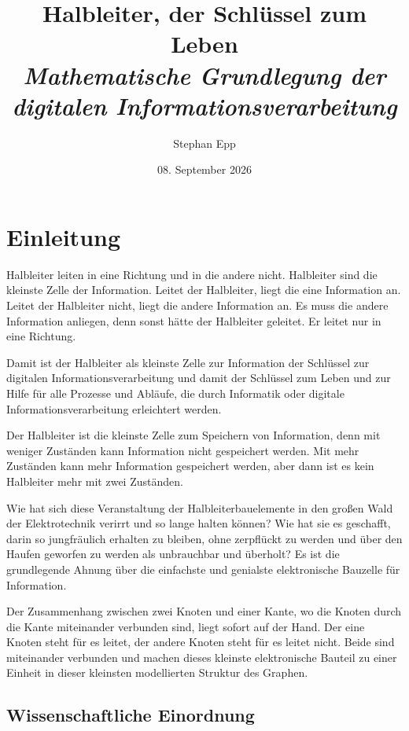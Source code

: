 \documentclass[12pt, a4paper]{article}
\title{\textbf{Halbleiter, der Schlüssel zum Leben}\\[0.5em]
  {\Large\itshape Mathematische Grundlegung der digitalen Informationsverarbeitung}}
\author{Stephan Epp}
\date{08. September 2026}
\theoremstyle{definition}
\theoremstyle{remark}
\begin{document}

\maketitle
\tableofcontents
\newpage

\section{Einleitung}
\label{sec:einleitung}

Halbleiter leiten in eine Richtung und in die andere nicht. Halbleiter sind die kleinste Zelle der Information. Leitet der Halbleiter, liegt die eine Information an. Leitet der Halbleiter nicht, liegt die andere Information an. Es muss die andere Information anliegen, denn sonst hätte der Halbleiter geleitet. Er leitet nur in eine Richtung.

Damit ist der Halbleiter als kleinste Zelle zur Information der Schlüssel zur digitalen Informationsverarbeitung und damit der Schlüssel zum Leben und zur Hilfe für alle Prozesse und Abläufe, die durch Informatik oder digitale Informationsverarbeitung erleichtert werden.

Der Halbleiter ist die kleinste Zelle zum Speichern von Information, denn mit weniger Zuständen kann Information nicht gespeichert werden. Mit mehr Zuständen kann mehr Information gespeichert werden, aber dann ist es kein Halbleiter mehr mit zwei Zuständen.

Wie hat sich diese Veranstaltung der Halbleiterbauelemente in den großen Wald der Elektrotechnik verirrt und so lange halten können? Wie hat sie es geschafft, darin so jungfräulich erhalten zu bleiben, ohne zerpflückt zu werden und über den Haufen geworfen zu werden als unbrauchbar und überholt? Es ist die grundlegende Ahnung über die einfachste und genialste elektronische Bauzelle für Information.

Der Zusammenhang zwischen zwei Knoten und einer Kante, wo die Knoten durch die Kante miteinander verbunden sind, liegt sofort auf der Hand. Der eine Knoten steht für es leitet, der andere Knoten steht für es leitet nicht. Beide sind miteinander verbunden und machen dieses kleinste elektronische Bauteil zu einer Einheit in dieser kleinsten modellierten Struktur des Graphen.

\subsection{Wissenschaftliche Einordnung}
\label{subsec:einordnung}
\end{document}

